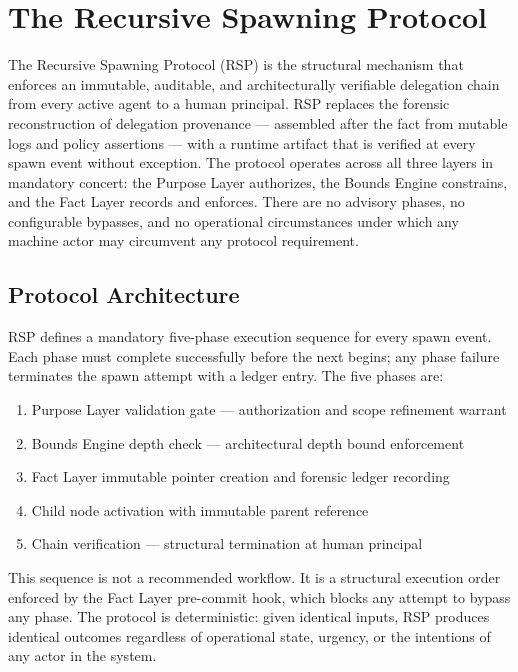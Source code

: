 \section{The Recursive Spawning Protocol}
\label{sec:rs-protocol}

The Recursive Spawning Protocol (RSP) is the structural mechanism that enforces an immutable, auditable, and architecturally verifiable delegation chain from every active agent to a human principal. RSP replaces the forensic reconstruction of delegation provenance — assembled after the fact from mutable logs and policy assertions — with a runtime artifact that is verified at every spawn event without exception. The protocol operates across all three \bxthree{} layers in mandatory concert: the Purpose Layer authorizes, the Bounds Engine constrains, and the Fact Layer records and enforces. There are no advisory phases, no configurable bypasses, and no operational circumstances under which any machine actor may circumvent any protocol requirement.

\subsection{Protocol Architecture}
\label{sec:rs-arch}

RSP defines a mandatory five-phase execution sequence for every spawn event. Each phase must complete successfully before the next begins; any phase failure terminates the spawn attempt with a ledger entry. The five phases are:

\begin{enumerate}
    \item Purpose Layer validation gate — authorization and scope refinement warrant
    \item Bounds Engine depth check — architectural depth bound enforcement
    \item Fact Layer immutable pointer creation and forensic ledger recording
    \item Child node activation with immutable parent reference
    \item Chain verification — structural termination at human principal
\end{enumerate}

This sequence is not a recommended workflow. It is a structural execution order enforced by the Fact Layer pre-commit hook, which blocks any attempt to bypass any phase. The protocol is deterministic: given identical inputs, RSP produces identical outcomes regardless of operational state, urgency, or the intentions of any actor in the system.

